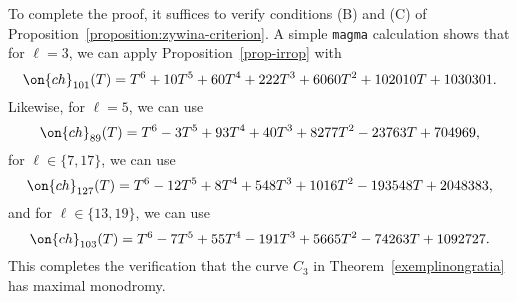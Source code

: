 %

To complete the proof, it suffices to verify conditions (B) and (C) of Proposition~\ref{proposition:zywina-criterion}. A simple {\tt magma} calculation shows that for $\ell = 3$, we can apply Proposition~\ref{prop-irrop} with
$$\on{ch}_{101}(T) = T^6 + 10T^5 + 60T^4 + 222T^3 + 6060T^2 + 102010T + 1030301.$$
Likewise, for $\ell = 5$, we can use
$$\on{ch}_{89}(T) = T^6 - 3T^5 + 93T^4 + 40T^3 + 8277T^2 - 23763T + 704969,$$
for $\ell \in \{7, 17\}$, we can use 
$$\on{ch}_{127}(T) = T^6 - 12T^5 + 8T^4 + 548T^3 + 1016T^2 - 193548T + 2048383,$$
and for $\ell \in \{13,19\}$, we can use
$$\on{ch}_{103}(T) = T^6 - 7T^5 + 55T^4 - 191T^3 + 5665T^2 - 74263T + 1092727
.$$
This completes the verification that the curve $C_3$ in Theorem~\ref{exemplinongratia} has maximal monodromy.

